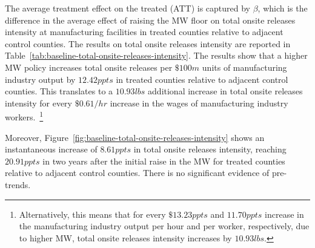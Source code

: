 \documentclass[12pt, english]{article}
\begin{document}
    

    The average treatment effect on the treated (ATT) is captured by $\beta$, which is the difference in the average effect of raising the MW floor on total onsite releases intensity at manufacturing facilities in treated counties relative to adjacent control counties. The results on total onsite releases intensity are reported in Table~\ref{tab:baseline-total-onsite-releases-intensity}. The results show that a higher MW policy increases total onsite releases per $\$100m$ units of manufacturing industry output by $12.42ppts$ in treated counties relative to adjacent control counties. This translates to a $10.93lbs$ additional increase in total onsite releases intensity for every $\$0.61/hr$ increase in the wages of manufacturing industry workers.~\footnote{\tiny Alternatively, this means that for every $\$13.23ppts$ and $11.70ppts$ increase in the manufacturing industry output per hour and per worker, respectively, due to higher MW, total onsite releases intensity increases by $10.93lbs$.}
    

    Moreover, Figure~\ref{fig:baseline-total-onsite-releases-intensity} shows an instantaneous increase of $8.61ppts$ in total onsite releases intensity, reaching $20.91ppts$ in two years after the initial raise in the MW for treated counties relative to adjacent control counties. There is no significant evidence of pre-trends.
\end{document}
